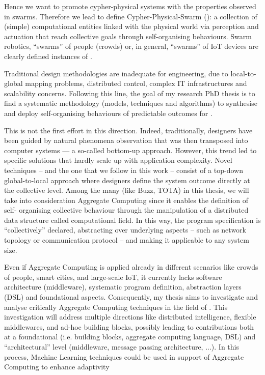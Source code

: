 \documentclass[11pt]{article}
\begin{document}
Hence we want to promote cypher-physical systems with the properties observed in swarms. Therefore we lead to define Cypher-Physical-Swarm (\cpws):
a collection of (simple) computational entities linked with the physical world via perception and actuation that reach collective goals through self-organising behaviours. Swarm robotics, ``swarms” of people (crowds) or, in general, ``swarms” of IoT devices are clearly defined instances of \cpws.

Traditional design methodologies are inadequate for \cpws engineering, due to local-to-global mapping problems, distributed control, complex IT infrastructures and scalability concerns.
Following this line, the goal of my research PhD thesis is to find a systematic methodology (models, techniques and algorithms)
to synthesise and deploy self-organising behaviours of predictable outcomes for \cpws.

This is not the first effort in this direction. Indeed, traditionally, designers have been guided
by natural phenomena observation that was then transposed into computer systems — a so-called
bottom-up approach. However, this trend led to specific solutions that hardly scale up with application complexity.
Novel techniques -- and the one that we follow in this work -- consist of a top-down global-to-local approach where designers define the system outcome directly at the collective level. Among the many (like Buzz, TOTA) in this thesis, we will take into consideration Aggregate Computing since it enables the definition of self-
organising collective behaviour through the manipulation of a distributed data structure called computational field. In this way, the program specification is “collectively” declared, abstracting over underlying aspects – such as network topology or communication protocol – and making it applicable to any system size. 

Even if Aggregate Computing is applied already in different scenarios like crowds of people, smart cities, and large-scale IoT, it currently lacks software architecture (middleware), systematic program definition, abstraction layers (DSL) and foundational aspects. Consequently, my thesis aims to investigate and analyse critically Aggregate
Computing techniques in the field of \cpws. This investigation will address multiple directions
like distributed intelligence, flexible middlewares, and ad-hoc building blocks, possibly leading to
contributions both at a foundational (i.e. building blocks, aggregate computing language,  DSL) and “architectural” level (middleware, message passing architecture, ...). In this process, Machine Learning techniques could be used in support of Aggregate Computing to enhance adaptivity
\end{document}
